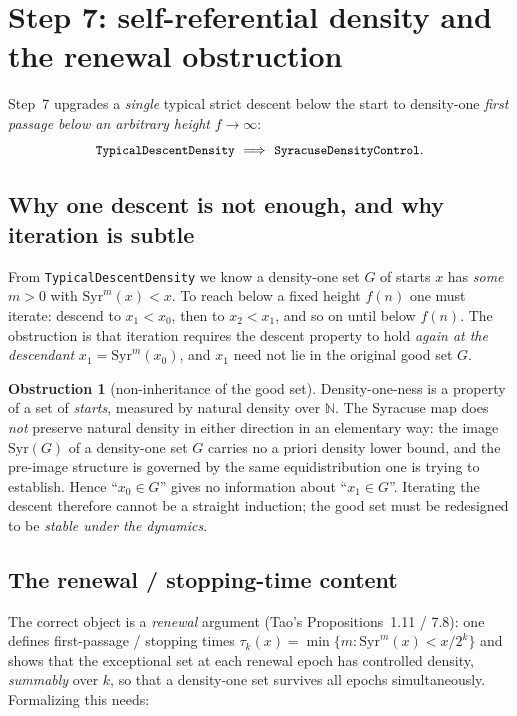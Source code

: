 \documentclass[11pt]{article}
\theoremstyle{plain}
\theoremstyle{definition}
\newtheorem{obstruction}[thm]{Obstruction}
\theoremstyle{remark}
\newcommand{\N}{\mathbb{N}}
\newcommand{\Syr}{\mathrm{Syr}}
\newcommand{\code}[1]{\texttt{\small #1}}
\begin{document}
\section{Step 7: self-referential density and the renewal obstruction}
\label{sec:step7}

Step~7 upgrades a \emph{single} typical strict descent below the start to
density-one \emph{first passage below an arbitrary height} $f\to\infty$:
\[
  \code{TypicalDescentDensity}\ \Longrightarrow\ \code{SyracuseDensityControl}.
\]

\subsection{Why one descent is not enough, and why iteration is subtle}

From \code{TypicalDescentDensity} we know a density-one set $G$ of starts $x$ has
\emph{some} $m>0$ with $\Syr^m(x)<x$. To reach below a fixed height $f(n)$ one
must iterate: descend to $x_1<x_0$, then to $x_2<x_1$, and so on until below
$f(n)$. The obstruction is that iteration requires the descent property to hold
\emph{again at the descendant} $x_1=\Syr^m(x_0)$, and $x_1$ need not lie in the
original good set $G$.

\begin{obstruction}[non-inheritance of the good set]\label{obs:inherit}
Density-one-ness is a property of a set of \emph{starts}, measured by natural
density over $\N$. The Syracuse map does \emph{not} preserve natural density in
either direction in an elementary way: the image $\Syr(G)$ of a density-one set
$G$ carries no a priori density lower bound, and the pre-image structure is
governed by the same equidistribution one is trying to establish. Hence
``$x_0\in G$'' gives no information about ``$x_1\in G$''. Iterating the descent
therefore cannot be a straight induction; the good set must be redesigned to be
\emph{stable under the dynamics}.
\end{obstruction}

\subsection{The renewal / stopping-time content}

The correct object is a \emph{renewal} argument (Tao's Propositions~1.11 / 7.8):
one defines first-passage / stopping times
$\tau_k(x)=\min\{m:\Syr^m(x)<x/2^k\}$ and shows that the exceptional set at each
renewal epoch has controlled density, \emph{summably} over $k$, so that a
density-one set survives all epochs simultaneously. Formalizing this needs:
\end{document}
